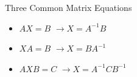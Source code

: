 \begin{frame}[shrink=8]{Three Common Matrix Equations}
\begin{itemize}
  \item $AX=B$ \pause $\rightarrow X=A^{-1}B$\pause
  \item $XA=B$ \pause $\rightarrow X=BA^{-1}$\pause
  \item $AXB=C$ \pause $\rightarrow X=A^{-1}CB^{-1}$
\end{itemize}
\end{frame}

